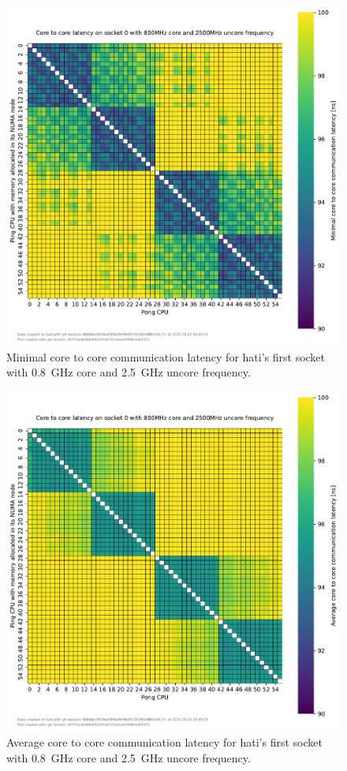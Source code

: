 \begin{figure}[]
    \centering
    \includegraphics[width=\columnwidth]{fig/core-to-core-latency/core-to-core-heatmap-min-800-2500.pdf}
    \caption{Minimal core to core communication latency for hati's first socket with \SI{0.8}{\GHz} core and \SI{2.5}{\GHz} uncore frequency.}
\end{figure}
\begin{figure}[]
    \centering
    \includegraphics[width=\columnwidth]{fig/core-to-core-latency/core-to-core-heatmap-avg-800-2500.pdf}
    \caption{Average core to core communication latency for hati's first socket with \SI{0.8}{\GHz} core and \SI{2.5}{\GHz} uncore frequency.}
\end{figure}

